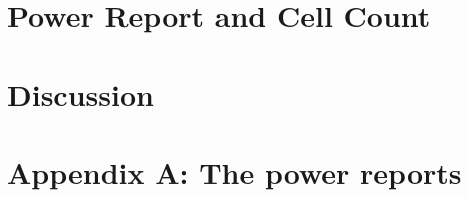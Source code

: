 \documentclass[11pt,a4paper]{article}
\begin{document}
\section{Power Report and Cell Count}
\label{section:power}

\section{Discussion}
\label{section:discussion}
\section{Appendix A: The power reports}
\label{section:reports}
\end{document}
